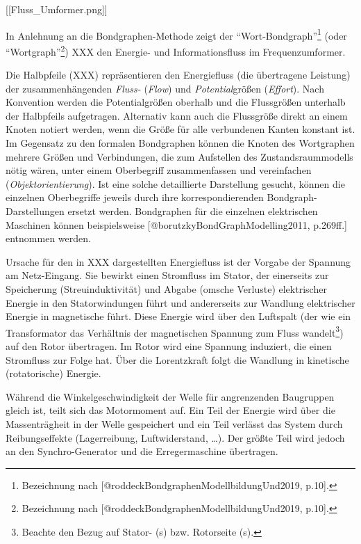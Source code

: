 {[}{[}Fluss\_Umformer.png{]}{]}

In Anlehnung an die Bondgraphen-Methode zeigt der
``Wort-Bondgraph''\footnote{Bezeichnung nach
  {[}@roddeckBondgraphenModellbildungUnd2019, p.10{]}.} (oder
``Wortgraph''\footnote{Bezeichnung nach
  {[}@roddeckBondgraphenModellbildungUnd2019, p.10{]}.}) XXX den
Energie- und Informationsfluss im Frequenzumformer.

Die Halbpfeile (XXX) repräsentieren den Energiefluss (die übertragene
Leistung) der zusammenhängenden \emph{Fluss-} (\emph{Flow}) und
\emph{Potential}größen (\emph{Effort}). Nach Konvention werden die
Potentialgrößen oberhalb und die Flussgrößen unterhalb der Halbpfeils
aufgetragen. Alternativ kann auch die Flussgröße direkt an einem Knoten
notiert werden, wenn die Größe für alle verbundenen Kanten konstant ist.
Im Gegensatz zu den formalen Bondgraphen können die Knoten des
Wortgraphen mehrere Größen und Verbindungen, die zum Aufstellen des
Zustandsraummodells nötig wären, unter einem Oberbegriff zusammenfassen
und vereinfachen (\emph{Objektorientierung}). Ist eine solche
detaillierte Darstellung gesucht, können die einzelnen Oberbegriffe
jeweils durch ihre korrespondierenden Bondgraph-Darstellungen ersetzt
werden. Bondgraphen für die einzelnen elektrischen Maschinen können
beispielsweise {[}@borutzkyBondGraphModelling2011, p.269ff.{]} entnommen
werden.

Ursache für den in XXX dargestellten Energiefluss ist der Vorgabe der
Spannung am Netz-Eingang. Sie bewirkt einen Stromfluss im Stator, der
einerseits zur Speicherung (Streuinduktivität) und Abgabe (omsche
Verluste) elektrischer Energie in den Statorwindungen führt und
andererseits zur Wandlung elektrischer Energie in magnetische führt.
Diese Energie wird über den Luftspalt (der wie ein Transformator das
Verhältnis der magnetischen Spannung zum Fluss wandelt\footnote{Beachte
  den Bezug auf Stator- (s) bzw. Rotorseite (s).}) auf den Rotor
übertragen. Im Rotor wird eine Spannung induziert, die einen Stromfluss
zur Folge hat. Über die Lorentzkraft folgt die Wandlung in kinetische
(rotatorische) Energie.

Während die Winkelgeschwindigkeit der Welle für angrenzenden Baugruppen
gleich ist, teilt sich das Motormoment auf. Ein Teil der Energie wird
über die Massenträgheit in der Welle gespeichert und ein Teil verlässt
das System durch Reibungseffekte (Lagerreibung, Luftwiderstand, \ldots).
Der größte Teil wird jedoch an den Synchro-Generator und die
Erregermaschine übertragen.

